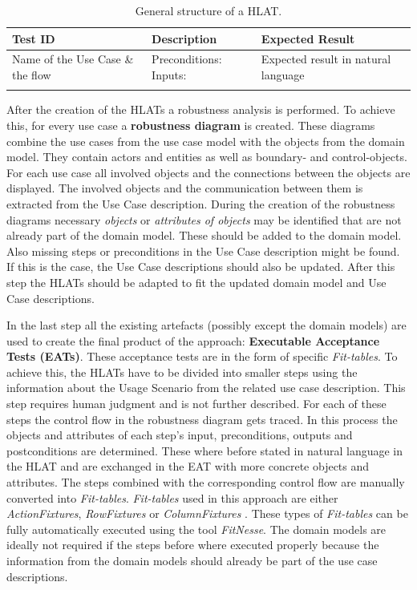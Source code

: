 \begin{table}[H]
	\caption{General structure of a HLAT.}
	
	\renewcommand{\arraystretch}{1.5}
	\begin{tabularx}{\textwidth}{X|X|X}
  		\textbf{Test ID} & \textbf{Description} & \textbf{Expected \newline Result} \\
  		\hline
  		Name of the Use Case \& the flow & Preconditions: \newline Inputs: & Expected result in natural language \\
  		\hline
  		 & &  \\

 	\end{tabularx}
 	\renewcommand{\arraystretch}{1}
 	\label{fig:1}

	
\end{table}


After the creation of the HLATs a robustness analysis is performed.
To achieve this, for every use case a \textbf{robustness diagram} is created.
These diagrams combine the use cases from the use case model with the objects from the domain model.
They contain actors and entities as well as boundary- and control-objects.
For each use case all involved objects and the connections between the objects are displayed.
The involved objects and the communication between them is extracted from the Use Case description.
During the creation of the robustness diagrams necessary \textit{objects} or \textit{attributes of objects} may be identified that are not already part of the domain model.
These should be added to the domain model.
Also missing steps or preconditions in the Use Case description might be found.
If this is the case, the Use Case descriptions should also be updated.
After this step the HLATs should be adapted to fit the updated domain model and Use Case descriptions.

In the last step all the existing artefacts (possibly except the domain models) are used to create the final product of the approach: \textbf{Executable Acceptance Tests (EATs)}.
These acceptance tests are in the form of specific \textit{Fit-tables}.
To achieve this, the HLATs have to be divided into smaller steps using the information about the Usage Scenario from the related use case description.
This step requires human judgment and is not further described.
For each of these steps the control flow in the robustness diagram gets traced.
In this process the objects and attributes of each step's input, preconditions, outputs and postconditions are determined.
These where before stated in natural language in the HLAT and are exchanged in the EAT with more concrete objects and attributes.
The steps combined with the corresponding control flow are manually converted into \textit{Fit-tables}.
\textit{Fit-tables} used in this approach are either \textit{ActionFixtures}, \textit{RowFixtures} or \textit{ColumnFixtures} \cite{Fit-tables}.
These types of \textit{Fit-tables} can be fully automatically executed using the tool \textit{FitNesse}.
The domain models are ideally not required if the steps before where executed properly because the information from the domain models should already be part of the use case descriptions.

